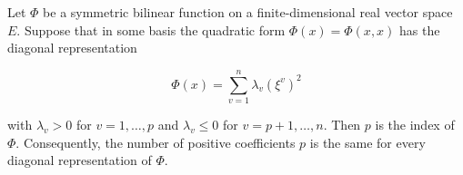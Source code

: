 Let $\Phi$ be a symmetric bilinear function on a finite-dimensional real vector space $E$. Suppose that in some basis the quadratic form $\Phi(x) = \Phi(x, x)$ has the diagonal representation

$$\Phi(x) = \sum_{v=1}^n \lambda_v (\xi^v)^2$$

with $\lambda_v > 0$ for $v = 1, \ldots, p$ and $\lambda_v \leq 0$ for $v = p+1, \ldots, n$. Then $p$ is the index of $\Phi$. Consequently, the number of positive coefficients $p$ is the same for every diagonal representation of $\Phi$.
